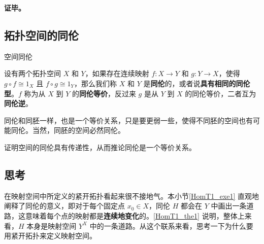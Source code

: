 \textbf{证毕。}

\subsection{拓扑空间的同伦}

\begin{definition}{空间同伦}

设有两个拓扑空间 $X$ 和 $Y$，如果存在连续映射 $f:X\rightarrow Y$ 和 $g: Y\rightarrow X$，使得 $g \circ f \cong 1_X$ 且 $f \circ g \cong 1_Y$，那么我们称 $X$ 和 $Y$ 是\textbf{同伦}的，或者说\textbf{具有相同的同伦型}。$f$ 称为从 $X$ 到 $Y$ 的\textbf{同伦等价}，反过来 $g$ 是从 $Y$ 到 $X$ 的同伦等价，二者互为\textbf{同伦逆}。

\end{definition}

同伦和同胚一样，也是一个等价关系，只是要更弱一些，使得不同胚的空间也有可能同伦。当然，同胚的空间必然同伦。

\begin{exercise}{}
证明空间的同伦具有传递性，从而推论同伦是一个等价关系。
\end{exercise}

\subsection{思考}

在映射空间中所定义的紧开拓扑看起来很不接地气。本小节\autoref{HomT1_exe1} 直观地阐释了同伦的意义，即对于每个固定点 $x_0\in X$，同伦 $H$ 都会在 $Y$ 中画出一条道路，这意味着每个点的映射都是\textbf{连续地变化}的。\autoref{HomT1_the1} 说明，整体上来看，$H$ 本身是映射空间 $Y^X$ 中的一条道路。从这个联系来看，思考一下为什么要用紧开拓扑来定义映射空间。

